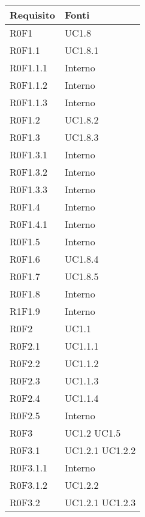 	\begin{center}

	\def\arraystretch{1.5}
	\bgroup
	\begin{longtable}{| p{4cm} | p{4cm} |}

		\hline
		\textbf{Requisito} & \textbf{Fonti} \\
		\hline


		R0F1  & UC1.8 \\
		\hline
		R0F1.1  &  UC1.8.1 \\
		\hline
		R0F1.1.1  &  Interno \\
		\hline
		R0F1.1.2  &  Interno \\
		\hline
		R0F1.1.3  &  Interno \\
		\hline
		R0F1.2  &  UC1.8.2 \\
		\hline
		R0F1.3  &  UC1.8.3 \\
		\hline
		R0F1.3.1  &  Interno \\
		\hline
		R0F1.3.2  &  Interno \\
		\hline
		R0F1.3.3  &  Interno \\
		\hline
		R0F1.4  &  Interno \\
		\hline
		R0F1.4.1  &  Interno \\
		\hline
		R0F1.5  &  Interno \\
		\hline
		R0F1.6  &  UC1.8.4 \\
		\hline
		R0F1.7  &  UC1.8.5 \\
		\hline
		R0F1.8  &  Interno \\
		\hline
		R1F1.9  &  Interno \\
		\hline
		R0F2  &  UC1.1 \\
		\hline
		R0F2.1  &  UC1.1.1 \\
		\hline
		R0F2.2  &  UC1.1.2 \\
		\hline
		R0F2.3  &  UC1.1.3 \\
		\hline
		R0F2.4  &  UC1.1.4 \\
		\hline
		R0F2.5  &  Interno  \\
		\hline
		R0F3  &  UC1.2 \newline UC1.5 \\
		\hline
		R0F3.1  &  UC1.2.1 \newline UC1.2.2 \\
		\hline
		R0F3.1.1  &  Interno \\
		\hline
		R0F3.1.2  &  UC1.2.2 \\
		\hline
		R0F3.2  &  UC1.2.1 \newline UC1.2.3 \\

\end{longtable}
\end{center}
